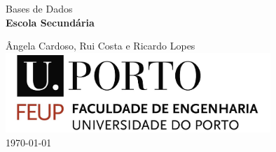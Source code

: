 

\begin{titlepage}
\begin{center}
 
\vspace*{3cm}

{\Large Bases de Dados}\\[1.5cm]

{\Huge \bfseries Escola Secundária \\[2cm]}

{\large Ângela Cardoso, Rui Costa e Ricardo Lopes}\\[2cm]

\includegraphics[width=10cm]{feup_logo.jpg}\\[2cm]


{\large \today}

\end{center}
\end{titlepage}